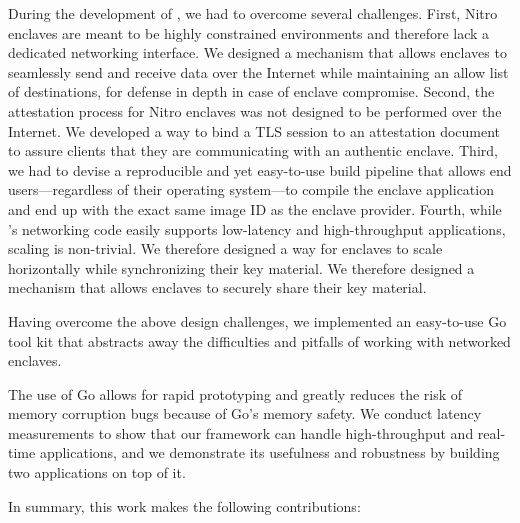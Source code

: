 During the development of \tool{}, we had to overcome several challenges.
First, Nitro enclaves are meant to be highly constrained environments and
therefore lack a dedicated networking interface.  We designed a mechanism that
allows enclaves to seamlessly send and receive data over the Internet while
maintaining an allow list of destinations, for defense in depth in case of
enclave compromise.
%
Second, the attestation process for Nitro enclaves was not designed to be
performed over the Internet.  We developed a way to bind a TLS session to
an attestation document to assure clients that they are communicating with
an authentic enclave.
%
Third, we had to devise a reproducible and yet easy-to-use build pipeline that
allows end users---regardless of their operating system---to compile the enclave
application and end up with the exact same image ID as the enclave provider.
%
Fourth, while \tool{}'s networking code easily supports low-latency and
high-throughput applications, scaling is non-trivial.  We therefore designed a
way for enclaves to scale horizontally while synchronizing their key material.
We therefore designed a mechanism that allows enclaves to securely share their
key material.

Having overcome the above design challenges, we implemented an easy-to-use Go
tool kit that abstracts away the difficulties and pitfalls of working with
networked enclaves.  

The use of Go allows for rapid prototyping and greatly
reduces the risk of memory corruption bugs because of Go's memory safety.  We
conduct latency measurements to show that our framework can handle
high-throughput and real-time applications, and we demonstrate its usefulness
and robustness by building two applications on top of it.

In summary, this work makes the following contributions:

